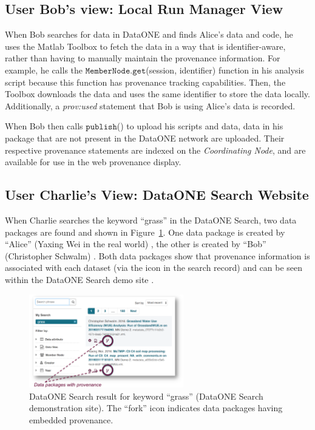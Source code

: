 \documentclass[a4paper]{llncs}
\newcommand{\mytt}[1]{\ensuremath{\mathtt{#1}}}
\begin{document}
\subsection{User Bob's view: Local Run Manager View}

When Bob searches for data in DataONE and finds Alice's data and code, he uses the Matlab Toolbox to fetch the data in a way that is identifier-aware, rather than having to manually maintain the provenance information. For example, he calls the \mytt{MemberNode.get}(session, identifier) function in his analysis script because this function has provenance tracking capabilities. Then, the Toolbox downloads the data and uses the same identifier to store the data locally. Additionally, a \emph{prov:used} statement that Bob is using Alice's data is recorded.

When Bob then calls \mytt{publish}() to upload his scripts and data, data in his package that are not present in the DataONE network are uploaded.  Their respective provenance statements are indexed on the \emph{Coordinating Node}, and are available for use in the web provenance display.



\subsection{User Charlie's View: DataONE Search Website}

When Charlie searches the keyword ``grass'' in the DataONE Search, two data packages are found and shown in Figure~\ref{fig1}. One data package is created by ``Alice'' (Yaxing Wei in the real world) \cite{yaxing}, the other is created by ``Bob'' (Christopher Schwalm) \cite{christopher}. Both data packages show that provenance information is associated with each dataset (via the icon in the search record) and can be seen within the DataONE Search demo site \cite{dataone-demo}.

\begin{figure}[t]
\centering   
\includegraphics[width=0.6\textwidth]{figs/ab-crop}
\caption{DataONE Search result for keyword  ``grass'' (DataONE Search demonstration site). The ``fork'' icon indicates data packages having embedded provenance.}
\label{fig1}
\end{figure}
\end{document}
